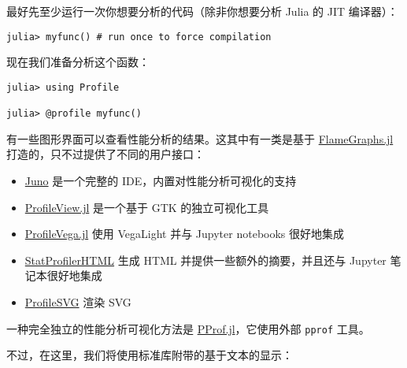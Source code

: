 最好先至少运行一次你想要分析的代码（除非你想要分析 Julia 的 JIT 编译器）：




\begin{verbatim}
julia> myfunc() # run once to force compilation
\end{verbatim}



现在我们准备分析这个函数：




\begin{verbatim}
julia> using Profile

julia> @profile myfunc()
\end{verbatim}



有一些图形界面可以查看性能分析的结果。这其中有一类是基于 \href{https://github.com/timholy/FlameGraphs.jl}{FlameGraphs.jl}打造的，只不过提供了不同的用户接口：



\begin{itemize}
\item \href{https://junolab.org/}{Juno} 是一个完整的 IDE，内置对性能分析可视化的支持


\item \href{https://github.com/timholy/ProfileView.jl}{ProfileView.jl} 是一个基于 GTK 的独立可视化工具


\item \href{https://github.com/davidanthoff/ProfileVega.jl}{ProfileVega.jl} 使用 VegaLight 并与 Jupyter notebooks 很好地集成


\item \href{https://github.com/tkluck/StatProfilerHTML.jl}{StatProfilerHTML} 生成 HTML 并提供一些额外的摘要，并且还与 Jupyter 笔记本很好地集成


\item \href{https://github.com/timholy/ProfileSVG.jl}{ProfileSVG} 渲染 SVG

\end{itemize}


一种完全独立的性能分析可视化方法是 \href{https://github.com/vchuravy/PProf.jl}{PProf.jl}，它使用外部 \texttt{pprof} 工具。



不过，在这里，我们将使用标准库附带的基于文本的显示：




